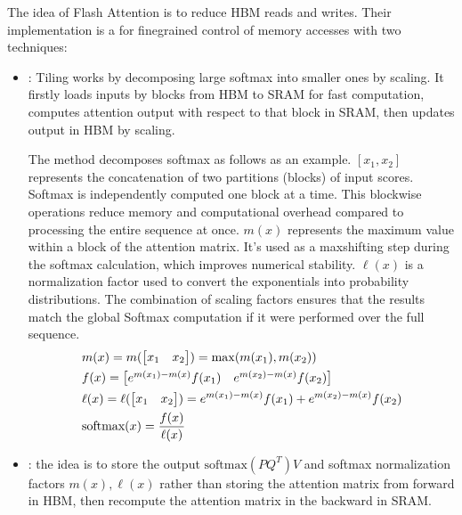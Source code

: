 \documentclass[letterpaper,11pt,english]{sphinxmanual}
\begin{document}
\sphinxAtStartPar
The idea of Flash Attention is  to reduce HBM
reads and writes. Their implementation is a  for
fine\sphinxhyphen{}grained control of memory accesses with two techniques:
\begin{itemize}
\item {} 
\sphinxAtStartPar
{}: Tiling works by decomposing large softmax into smaller
ones by scaling. It firstly loads inputs by blocks from HBM to SRAM
for fast computation, computes attention output with respect to that
block in SRAM, then updates output in HBM by scaling.

\sphinxAtStartPar
The method decomposes softmax as follows as an example.
\([x_1, x_2]\) represents the concatenation of two partitions
(blocks) of input scores. Softmax is independently computed one block
at a time. This block\sphinxhyphen{}wise operations reduce memory and computational
overhead compared to processing the entire sequence at once.
\(m(x)\) represents the maximum value within a block of the
attention matrix. It’s used as a max\sphinxhyphen{}shifting step during the softmax
calculation, which improves numerical stability. \(\ell(x)\) is a
normalization factor used to convert the exponentials into probability
distributions. The combination of scaling factors ensures that the
results match the global Softmax computation if it were performed over
the full sequence.
\begin{equation*}
\begin{split}&m(x) = m(\begin{bmatrix}x_1 & x_2\end{bmatrix}) = \max(m(x_1), m(x_2))\\
&f(x) = \begin{bmatrix} e^{m(x_1)-m(x)}f(x_1) & e^{m(x_2)-m(x)}f(x_2)\end{bmatrix}\\
&\ell(x) = \ell(\begin{bmatrix}x_1 & x_2\end{bmatrix}) = e^{m(x_1)-m(x)}f(x_1)+e^{m(x_2)-m(x)}f(x_2)\\
&\text{softmax}(x) = {f(x)\over \ell(x)}\end{split}
\end{equation*}
\item {} 
\sphinxAtStartPar
{}: the idea is to store the output
\(\text{softmax}(PQ^T)V\) and softmax normalization factors
\(m(x), \ell(x)\) rather than storing the attention matrix from
forward in HBM, then recompute the attention matrix in the backward in
SRAM.


\end{itemize}
\end{document}
